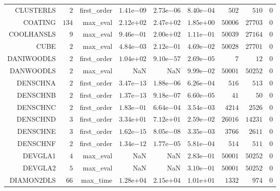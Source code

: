 \begin{longtable}{rrrrrrrrr}
CLUSTERLS & \(     2\) & first\_order & \( 1.41\)e\(-09\) & \( 2.73\)e\(-06\) & \( 8.40\)e\(-04\) & \(   502\) & \(   510\) & \(     0\) \\
COATING & \(   134\) & max\_eval & \( 2.12\)e\(+02\) & \( 2.47\)e\(+02\) & \( 1.85\)e\(+00\) & \( 50006\) & \( 27703\) & \(     0\) \\
COOLHANSLS & \(     9\) & max\_eval & \( 9.46\)e\(-01\) & \( 2.00\)e\(+02\) & \( 1.11\)e\(-01\) & \( 50039\) & \( 27164\) & \(     0\) \\
CUBE & \(     2\) & max\_eval & \( 4.84\)e\(-03\) & \( 2.12\)e\(-01\) & \( 4.69\)e\(-02\) & \( 50028\) & \( 27701\) & \(     0\) \\
DANIWOODLS & \(     2\) & first\_order & \( 1.04\)e\(+02\) & \( 9.10\)e\(-57\) & \( 2.69\)e\(-05\) & \(     7\) & \(    12\) & \(     0\) \\
DANWOODLS & \(     2\) & max\_eval &       NaN &       NaN & \( 9.99\)e\(-02\) & \( 50001\) & \( 50252\) & \(     0\) \\
DENSCHNA & \(     2\) & first\_order & \( 3.47\)e\(-13\) & \( 1.88\)e\(-06\) & \( 6.26\)e\(-04\) & \(   516\) & \(   513\) & \(     0\) \\
DENSCHNB & \(     2\) & first\_order & \( 1.37\)e\(-13\) & \( 9.18\)e\(-07\) & \( 6.60\)e\(-05\) & \(    41\) & \(    50\) & \(     0\) \\
DENSCHNC & \(     2\) & first\_order & \( 1.83\)e\(-01\) & \( 6.64\)e\(-04\) & \( 3.54\)e\(-03\) & \(  4214\) & \(  2526\) & \(     0\) \\
DENSCHND & \(     3\) & first\_order & \( 3.34\)e\(+01\) & \( 7.12\)e\(+01\) & \( 2.59\)e\(-02\) & \( 26016\) & \( 14231\) & \(     0\) \\
DENSCHNE & \(     3\) & first\_order & \( 1.62\)e\(-15\) & \( 8.05\)e\(-08\) & \( 3.35\)e\(-03\) & \(  3766\) & \(  2611\) & \(     0\) \\
DENSCHNF & \(     2\) & first\_order & \( 1.34\)e\(-12\) & \( 1.77\)e\(-05\) & \( 5.81\)e\(-04\) & \(   514\) & \(   511\) & \(     0\) \\
DEVGLA1 & \(     4\) & max\_eval &       NaN &       NaN & \( 2.83\)e\(-01\) & \( 50001\) & \( 50252\) & \(     0\) \\
DEVGLA2 & \(     5\) & max\_eval &       NaN &       NaN & \( 3.10\)e\(-01\) & \( 50001\) & \( 50252\) & \(     0\) \\
DIAMON2DLS & \(    66\) & max\_time & \( 1.28\)e\(+04\) & \( 2.15\)e\(+04\) & \( 1.01\)e\(+01\) & \(  1332\) & \(   974\) & \(     0\) \\

\end{longtable}
